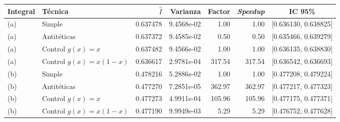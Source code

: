 \begin{tabular}{llrrrrc}
\toprule
Integral & Técnica & $\hat I$ & Varianza & Factor & \emph{Speedup} & IC 95\% \\
\midrule
(a) & Simple & 0.637478 & 9.4568e-02 & 1.00 & 1.00 & [0.636130, 0.638825] \\
(a) & Antitéticas & 0.637372 & 9.4585e-02 & 0.50 & 0.50 & [0.635466, 0.639279] \\
(a) & Control $g(x)=x$ & 0.637482 & 9.4566e-02 & 1.00 & 1.00 & [0.636135, 0.638830] \\
(a) & Control $g(x)=x(1-x)$ & 0.636617 & 2.9781e-04 & 317.54 & 317.54 & [0.636542, 0.636693] \\
(b) & Simple & 0.478216 & 5.2886e-02 & 1.00 & 1.00 & [0.477208, 0.479224] \\
(b) & Antitéticas & 0.477270 & 7.2851e-05 & 362.97 & 362.97 & [0.477217, 0.477323] \\
(b) & Control $g(x)=x$ & 0.477273 & 4.9911e-04 & 105.96 & 105.96 & [0.477175, 0.477371] \\
(b) & Control $g(x)=x(1-x)$ & 0.477190 & 9.9949e-03 & 5.29 & 5.29 & [0.476752, 0.477628] \\
\bottomrule
\end{tabular}
